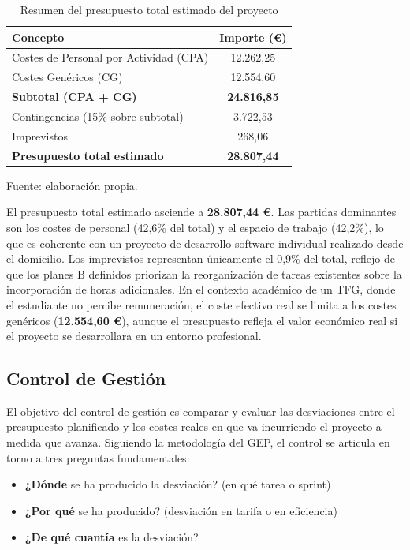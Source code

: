 \documentclass{article}
\begin{document}
    \begin{table}[H]
    \centering
    \begin{tabular}{lc}
    \hline
    \textbf{Concepto} & \textbf{Importe (\euro)} \\
    \hline
    Costes de Personal por Actividad (CPA) & 12.262,25 \\
    Costes Genéricos (CG) & 12.554,60 \\
    \hline
    \textbf{Subtotal (CPA + CG)} & \textbf{24.816,85} \\
    Contingencias (15\% sobre subtotal) & 3.722,53 \\
    Imprevistos & 268,06 \\
    \hline
    \textbf{Presupuesto total estimado} & \textbf{28.807,44} \\
    \hline
    \end{tabular}
    \caption{Resumen del presupuesto total estimado del proyecto}
    \label{tab:presupuesto_total}
    \footnotesize Fuente: elaboración propia.
    \end{table}

    \justify
    El presupuesto total estimado asciende a \textbf{28.807,44 \euro}. Las partidas 
    dominantes son los costes de personal (42,6\% del total) y el espacio de trabajo 
    (42,2\%), lo que es coherente con un proyecto de desarrollo software individual 
    realizado desde el domicilio. Los imprevistos representan únicamente el 0,9\% 
    del total, reflejo de que los planes B definidos priorizan la reorganización de 
    tareas existentes sobre la incorporación de horas adicionales. En el contexto 
    académico de un TFG, donde el estudiante no percibe remuneración, el coste 
    efectivo real se limita a los costes genéricos (\textbf{12.554,60 \euro}), 
    aunque el presupuesto refleja el valor económico real si el proyecto se 
    desarrollara en un entorno profesional.

    \subsection{Control de Gestión}
    \normalsize
    \setlength{\parskip}{0.6em}
    \justify
    El objetivo del control de gestión es comparar y evaluar las desviaciones entre 
    el presupuesto planificado y los costes reales en que va incurriendo el proyecto 
    a medida que avanza. Siguiendo la metodología del GEP, el control se articula 
    en torno a tres preguntas fundamentales:

    \begin{itemize}[leftmargin=*, itemsep=1pt]
    \item \textbf{¿Dónde} se ha producido la desviación? (en qué tarea o sprint)
    \item \textbf{¿Por qué} se ha producido? (desviación en tarifa o en eficiencia)
    \item \textbf{¿De qué cuantía} es la desviación?
    \end{itemize}
\end{document}
